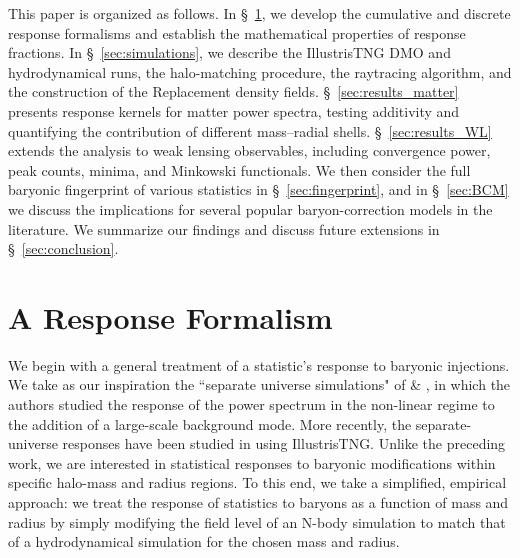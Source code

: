 \documentclass[linenumbers,trackchanges]{aastex701}
\begin{document}
This paper is organized as follows. In \S~\ref{sec:formalism}, we develop the cumulative and discrete response formalisms and establish the mathematical properties of response fractions. In \S~\ref{sec:simulations}, we describe the IllustrisTNG DMO and hydrodynamical runs, the halo-matching procedure, the raytracing algorithm, and the construction of the Replacement density fields. \S~\ref{sec:results_matter} presents response kernels for matter power spectra, testing additivity and quantifying the contribution of different mass–radial shells. \S~\ref{sec:results_WL} extends the analysis to weak lensing observables, including convergence power, peak counts, minima, and Minkowski functionals. We then consider the full baryonic fingerprint of various statistics in \S~\ref{sec:fingerprint}, and in \S~\ref{sec:BCM} we discuss the implications for several popular baryon-correction models in the literature. We summarize our findings and discuss future extensions in \S~\ref{sec:conclusion}.

\section{A Response Formalism}
\label{sec:formalism}
We begin with a general treatment of a statistic’s response to baryonic injections. We take as our inspiration the ``separate universe simulations" of \citet{Li14} \& \citet{Wagner15}, in which the authors studied the response of the power spectrum in the non-linear regime to the addition of a large-scale background mode. More recently, the separate-universe responses have been studied in \citet{Barreira19} using IllustrisTNG. Unlike the preceding work, we are interested in statistical responses to baryonic modifications within specific halo-mass and radius regions. To this end, we take a simplified, empirical approach: we treat the response of statistics to baryons as a function of mass and radius by simply modifying the field level of an N-body simulation to match that of a hydrodynamical simulation for the chosen mass and radius.
\end{document}
